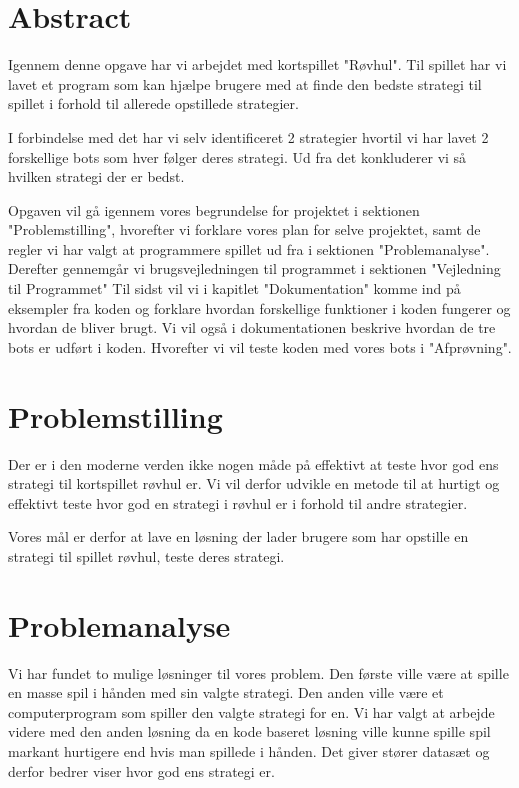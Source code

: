 \documentclass[a4paper, 12pt]{article}
\begin{document}
\section{Abstract}

Igennem denne opgave har vi arbejdet med kortspillet "Røvhul". Til spillet har vi lavet et program som kan hjælpe brugere med at finde den bedste strategi til spillet i forhold til allerede opstillede strategier. 

I forbindelse med det har vi selv identificeret 2 strategier hvortil vi har lavet 2 forskellige bots som hver følger deres strategi. Ud fra det konkluderer vi så hvilken strategi der er bedst.

Opgaven vil gå igennem vores begrundelse for projektet i sektionen "Problemstilling", hvorefter vi forklare vores plan for selve projektet, samt de regler vi har valgt at programmere spillet ud fra i sektionen "Problemanalyse". 
\bigbreak
Derefter gennemgår vi brugsvejledningen til programmet i sektionen "Vejledning til Programmet"
\bigbreak
Til sidst vil vi i kapitlet "Dokumentation" komme ind på eksempler fra koden og forklare hvordan forskellige funktioner i koden fungerer og hvordan de bliver brugt. Vi vil også i dokumentationen beskrive hvordan de tre bots er udført i koden. Hvorefter vi vil teste koden med vores bots i "Afprøvning". 

\section{Problemstilling}

Der er i den moderne verden ikke nogen måde på effektivt at teste hvor god ens strategi til kortspillet røvhul er. Vi vil derfor udvikle en metode til at hurtigt og effektivt teste hvor god en strategi i røvhul er i forhold til andre strategier.

Vores mål er derfor at lave en løsning der lader brugere som har opstille en strategi til spillet røvhul, teste deres strategi.

\section{Problemanalyse}

Vi har fundet to mulige løsninger til vores problem. Den første ville være at spille en masse spil i hånden med sin valgte strategi. Den anden ville være et computerprogram som spiller den valgte strategi for en. Vi har valgt at arbejde videre med den anden løsning da en kode baseret løsning ville kunne spille spil markant hurtigere end hvis man spillede i hånden. Det giver stører datasæt og derfor bedrer viser hvor god ens strategi er.
\end{document}
